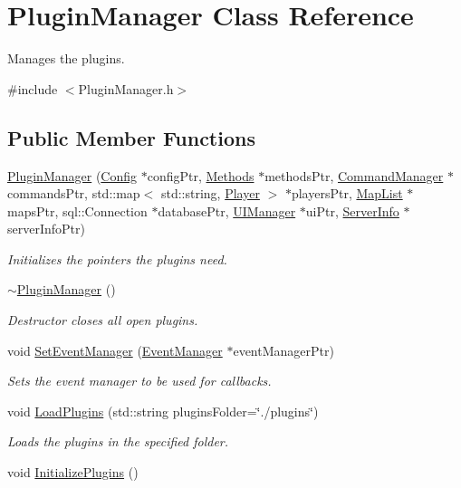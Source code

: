 \hypertarget{classPluginManager}{\section{Plugin\-Manager Class Reference}
\label{classPluginManager}
}


Manages the plugins.  




{\ttfamily \#include $<$Plugin\-Manager.\-h$>$}

\subsection*{Public Member Functions}
\begin{DoxyCompactItemize}
\item 
\hyperlink{classPluginManager_a069a83068775116bd53350f39db0c844}{Plugin\-Manager} (\hyperlink{classConfig}{Config} $\ast$config\-Ptr, \hyperlink{classMethods}{Methods} $\ast$methods\-Ptr, \hyperlink{classCommandManager}{Command\-Manager} $\ast$commands\-Ptr, std\-::map$<$ std\-::string, \hyperlink{structPlayer}{Player} $>$ $\ast$players\-Ptr, \hyperlink{classMapList}{Map\-List} $\ast$maps\-Ptr, sql\-::\-Connection $\ast$database\-Ptr, \hyperlink{classUIManager}{U\-I\-Manager} $\ast$ui\-Ptr, \hyperlink{structServerInfo}{Server\-Info} $\ast$server\-Info\-Ptr)
\begin{DoxyCompactList}\small\item\em Initializes the pointers the plugins need. \end{DoxyCompactList}\item 
\hypertarget{classPluginManager_ab657302ef5af357907ae11ad817f5dfc}{\hyperlink{classPluginManager_ab657302ef5af357907ae11ad817f5dfc}{$\sim$\-Plugin\-Manager} ()}\label{classPluginManager_ab657302ef5af357907ae11ad817f5dfc}

\begin{DoxyCompactList}\small\item\em Destructor closes all open plugins. \end{DoxyCompactList}\item 
void \hyperlink{classPluginManager_a7ed7485291babeed3109a1a364b6d308}{Set\-Event\-Manager} (\hyperlink{classEventManager}{Event\-Manager} $\ast$event\-Manager\-Ptr)
\begin{DoxyCompactList}\small\item\em Sets the event manager to be used for callbacks. \end{DoxyCompactList}\item 
void \hyperlink{classPluginManager_a0ff203ba125f85688fa752bf789418f0}{Load\-Plugins} (std\-::string plugins\-Folder=\char`\"{}./plugins\char`\"{})
\begin{DoxyCompactList}\small\item\em Loads the plugins in the specified folder. \end{DoxyCompactList}\item 
\hypertarget{classPluginManager_aba7e19d75b25ca1a91b92d95b173240f}{void \hyperlink{classPluginManager_aba7e19d75b25ca1a91b92d95b173240f}{Initialize\-Plugins} ()}\label{classPluginManager_aba7e19d75b25ca1a91b92d95b173240f}


\end{DoxyCompactItemize}
